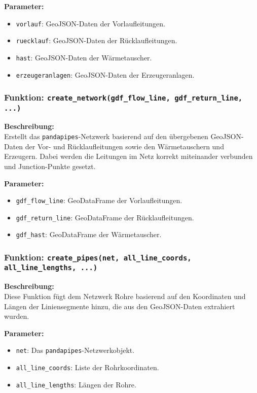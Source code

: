 \textbf{Parameter:}
\begin{itemize}
    \item \texttt{vorlauf}: GeoJSON-Daten der Vorlaufleitungen.
    \item \texttt{ruecklauf}: GeoJSON-Daten der Rücklaufleitungen.
    \item \texttt{hast}: GeoJSON-Daten der Wärmetauscher.
    \item \texttt{erzeugeranlagen}: GeoJSON-Daten der Erzeugeranlagen.
\end{itemize}

\subsubsection{Funktion: \texttt{create\_network(gdf\_flow\_line, gdf\_return\_line, ...)}}
\textbf{Beschreibung:}\\
Erstellt das \texttt{pandapipes}-Netzwerk basierend auf den übergebenen GeoJSON-Daten der Vor- und Rücklaufleitungen sowie den Wärmetauschern und Erzeugern. Dabei werden die Leitungen im Netz korrekt miteinander verbunden und Junction-Punkte gesetzt.

\textbf{Parameter:}
\begin{itemize}
    \item \texttt{gdf\_flow\_line}: GeoDataFrame der Vorlaufleitungen.
    \item \texttt{gdf\_return\_line}: GeoDataFrame der Rücklaufleitungen.
    \item \texttt{gdf\_hast}: GeoDataFrame der Wärmetauscher.
\end{itemize}

\subsubsection{Funktion: \texttt{create\_pipes(net, all\_line\_coords, all\_line\_lengths, ...)}}
\textbf{Beschreibung:}\\
Diese Funktion fügt dem Netzwerk Rohre basierend auf den Koordinaten und Längen der Liniensegmente hinzu, die aus den GeoJSON-Daten extrahiert wurden.

\textbf{Parameter:}
\begin{itemize}
    \item \texttt{net}: Das \texttt{pandapipes}-Netzwerkobjekt.
    \item \texttt{all\_line\_coords}: Liste der Rohrkoordinaten.
    \item \texttt{all\_line\_lengths}: Längen der Rohre.
\end{itemize}

